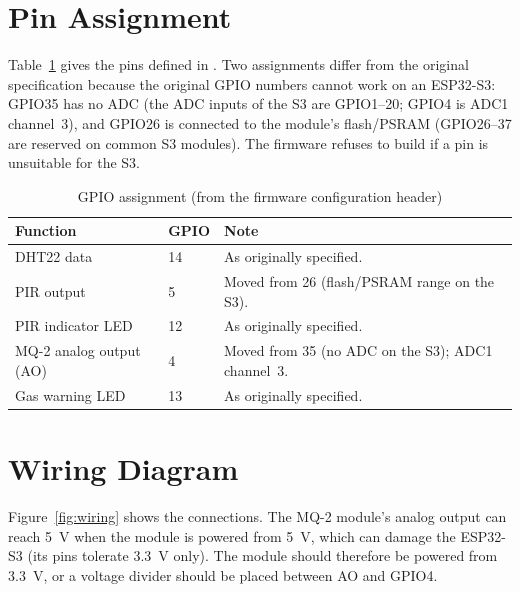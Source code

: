 \documentclass[12pt,a4paper,oneside]{report}
\newcommand{\code}[1]{\texttt{\detokenize{#1}}}
\begin{document}
\section{Pin Assignment}
Table~\ref{tab:pins} gives the pins defined in \code{config.h}. Two assignments differ from the original specification because the original GPIO numbers cannot work on an ESP32-S3: GPIO35 has no ADC (the ADC inputs of the S3 are GPIO1--20; GPIO4 is ADC1 channel~3), and GPIO26 is connected to the module's flash/PSRAM (GPIO26--37 are reserved on common S3 modules). The firmware refuses to build if a pin is unsuitable for the S3.

\begin{table}[H]
\centering
\caption{GPIO assignment (from the firmware configuration header)}
\label{tab:pins}
\begin{tabularx}{\textwidth}{llX}
\toprule
\textbf{Function} & \textbf{GPIO} & \textbf{Note}\\
\midrule
DHT22 data & 14 & As originally specified.\\
PIR output & 5 & Moved from 26 (flash/PSRAM range on the S3).\\
PIR indicator LED & 12 & As originally specified.\\
MQ-2 analog output (AO) & 4 & Moved from 35 (no ADC on the S3); ADC1 channel~3.\\
Gas warning LED & 13 & As originally specified.\\
\bottomrule
\end{tabularx}
\end{table}

\section{Wiring Diagram}
Figure~\ref{fig:wiring} shows the connections. The MQ-2 module's analog output can reach 5~V when the module is powered from 5~V, which can damage the ESP32-S3 (its pins tolerate 3.3~V only). The module should therefore be powered from 3.3~V, or a voltage divider should be placed between AO and GPIO4.
\end{document}
